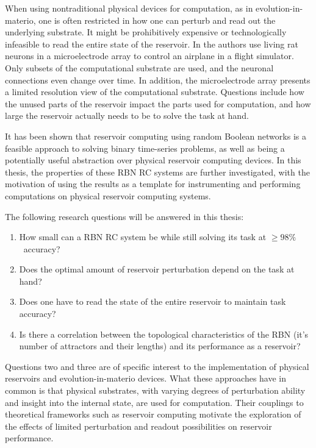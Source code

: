 When using nontraditional physical devices for computation, as in evolution-in-materio,
one is often restricted in how one can perturb and read out the underlying substrate.
It might be prohibitively expensive or technologically infeasible to read the entire state of the reservoir.
In \cite{demarse2005adaptive} the authors use living rat neurons in a microelectrode array to control an airplane in a flight simulator.
Only subsets of the computational substrate are used,
and the neuronal connections even change over time.
In addition, the microelectrode array presents a limited resolution view of the computational substrate.
Questions include how the unused parts of the reservoir impact the parts used for computation,
and how large the reservoir actually needs to be to solve the task at hand.

It has been shown that reservoir computing using random Boolean networks is a feasible approach to solving binary time-series problems,
as well as being a potentially useful abstraction over physical reservoir computing devices.
In this thesis, the properties of these RBN RC systems are further investigated,
with the motivation of using the results as a template for instrumenting and performing computations on physical reservoir computing systems.

The following research questions will be answered in this thesis:
\begin{enumerate}
    \item How small can a RBN RC system be while still solving its task at $ \geq 98\% $ accuracy?
    \item Does the optimal amount of reservoir perturbation depend on the task at hand?
    \item Does one have to read the state of the entire reservoir to maintain task accuracy?
    \item Is there a correlation between the topological characteristics of the RBN (it's number of attractors and their lengths) and its performance as a reservoir?
\end{enumerate}

Questions two and three are of specific interest to the implementation of physical reservoirs and evolution-in-materio devices.
What these approaches have in common is that physical substrates,
with varying degrees of perturbation ability and insight into the internal state,
are used for computation.
Their couplings to theoretical frameworks such as reservoir computing motivate the exploration of the effects of limited perturbation and readout possibilities on reservoir performance.

